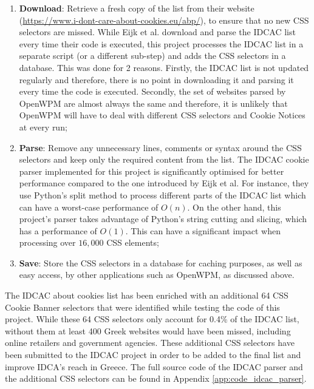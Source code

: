 \documentclass[../main.tex]{subfiles}
\begin{document}
\begin{enumerate}
    \item \textbf{Download}: Retrieve a fresh copy of the  list from their website (\url{https://www.i-dont-care-about-cookies.eu/abp/}), to ensure that no new CSS selectors are missed. While Eijk et al. download and parse the IDCAC list every time their code is executed, this project processes the IDCAC list in a separate script (or a different sub-step) and adds the CSS selectors in a database. This was done for 2 reasons. Firstly, the IDCAC list is not updated regularly and therefore, there is no point in downloading it and parsing it every time the code is executed. Secondly, the set of websites parsed by OpenWPM are almost always the same and therefore, it is unlikely that OpenWPM will have to deal with different CSS selectors and Cookie Notices at every run;
    
    \item \textbf{Parse}: Remove any unnecessary lines, comments or syntax around the CSS selectors and keep only the required content from the list. The IDCAC cookie parser implemented for this project is significantly optimised for better performance compared to the one introduced by Eijk et al. For instance, they use Python’s split method \cite{python_str_doc} to process different parts of the IDCAC list which can have a worst-case performance of $O(n)$. On the other hand, this project’s parser takes advantage of Python’s string cutting and slicing, which has a performance of $O(1)$. This can have a significant impact when processing over $16,000$ CSS elements;
    
    \item \textbf{Save}: Store the CSS selectors in a database for caching purposes, as well as easy access, by other applications such as OpenWPM, as discussed above.
\end{enumerate}

The IDCAC about cookies list has been enriched with an additional 64 CSS Cookie Banner selectors that were identified while testing the code of this project. While these 64 CSS selectors only account for 0.4\% of the IDCAC list, without them at least 400 Greek websites would have been missed, including online retailers and government agencies. These additional CSS selectors have been submitted to the IDCAC project in order to be added to the final list and improve IDCA's reach in Greece. The full source code of the IDCAC parser and the additional CSS selectors can be found in Appendix \ref{app:code_idcac_parser}. 
\end{document}
